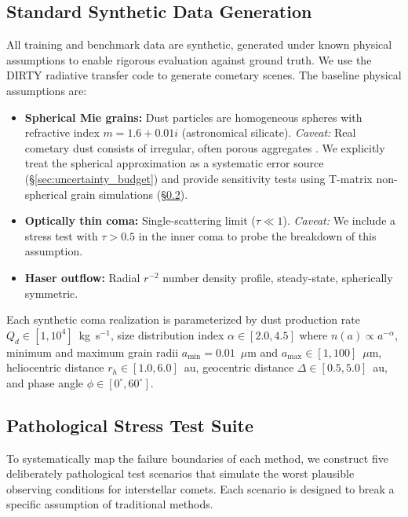\documentclass[preprint2]{aastex631}
\begin{document}
\subsection{Standard Synthetic Data Generation}

All training and benchmark data are synthetic, generated under known physical assumptions to enable rigorous evaluation against ground truth. We use the DIRTY radiative transfer code \citep{gordon01} to generate cometary scenes. The baseline physical assumptions are:

\begin{itemize}
    \item \textbf{Spherical Mie grains:} Dust particles are homogeneous spheres with refractive index $m = 1.6 + 0.01i$ (astronomical silicate). \textit{Caveat:} Real cometary dust consists of irregular, often porous aggregates \citep{kolokolova04}. We explicitly treat the spherical approximation as a systematic error source (\S\ref{sec:uncertainty_budget}) and provide sensitivity tests using T-matrix non-spherical grain simulations (\S\ref{sec:stress}).
    \item \textbf{Optically thin coma:} Single-scattering limit ($\tau \ll 1$). \textit{Caveat:} We include a stress test with $\tau > 0.5$ in the inner coma to probe the breakdown of this assumption.
    \item \textbf{Haser outflow:} Radial $r^{-2}$ number density profile, steady-state, spherically symmetric.
\end{itemize}

Each synthetic coma realization is parameterized by dust production rate $Q_d \in [1, 10^4]$~kg~s$^{-1}$, size distribution index $\alpha \in [2.0, 4.5]$ where $n(a) \propto a^{-\alpha}$, minimum and maximum grain radii $a_{\min} = 0.01$~$\mu$m and $a_{\max} \in [1, 100]$~$\mu$m, heliocentric distance $r_h \in [1.0, 6.0]$~au, geocentric distance $\Delta \in [0.5, 5.0]$~au, and phase angle $\phi \in [0^\circ, 60^\circ]$.

\subsection{Pathological Stress Test Suite}\label{sec:stress}

To systematically map the failure boundaries of each method, we construct five deliberately pathological test scenarios that simulate the worst plausible observing conditions for interstellar comets. Each scenario is designed to break a specific assumption of traditional methods.
\end{document}

